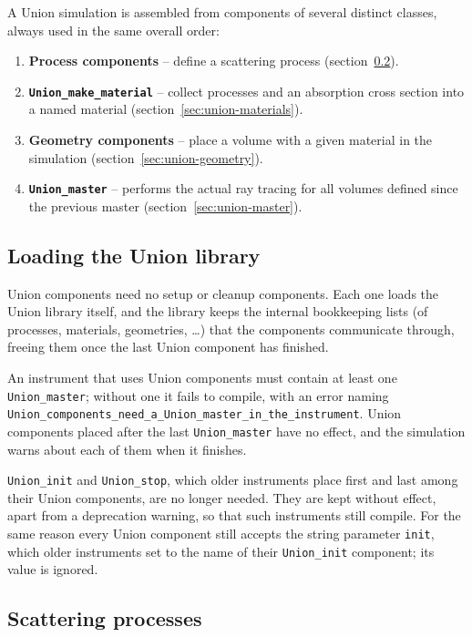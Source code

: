 A Union simulation is assembled from components of several distinct
classes, always used in the same overall order:

\begin{enumerate}
\item \textbf{Process components} -- define a scattering process
  (section~\ref{sec:union-processes}).
\item \textbf{\texttt{Union\_make\_material}} -- collect processes and an
  absorption cross section into a named material
  (section~\ref{sec:union-materials}).
\item \textbf{Geometry components} -- place a volume with a given material
  in the simulation (section~\ref{sec:union-geometry}).
\item \textbf{\texttt{Union\_master}} -- performs the actual ray tracing
  for all volumes defined since the previous master
  (section~\ref{sec:union-master}).
\end{enumerate}

\subsection{Loading the Union library}
\label{sec:union-library}

Union components need no setup or cleanup components. Each one loads the
Union library itself, and the library keeps the internal bookkeeping lists
(of processes, materials, geometries, \ldots) that the components communicate through, freeing them once
the last Union component has finished.

An instrument that uses Union components must contain at least one
\texttt{Union\_master}; without one it fails to compile, with an error
naming \texttt{Union\_components\_need\_a\_Union\_master\_in\_the\_instrument}.
Union components placed after the last \texttt{Union\_master} have no
effect, and the simulation warns about each of them when it finishes.

\texttt{Union\_init} and \texttt{Union\_stop}, which older instruments
place first and last among their Union components, are no longer needed.
They are kept without effect, apart from a deprecation warning, so that such
instruments still compile. For the same reason every Union component still
accepts the string parameter \texttt{init}, which older instruments set to the
name of their \texttt{Union\_init} component; its value is ignored.

\subsection{Scattering processes}
\label{sec:union-processes}

